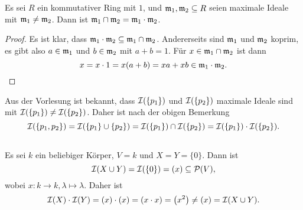 \documentclass[a4paper,10pt]{article}
\begin{document}
\section{}


\subsection{}
\begin{bem}
 Es sei $R$ ein kommutativer Ring mit $1$, und $\mathfrak{m}_1, \mathfrak{m}_2 \subseteq R$ seien maximale Ideale mit $\mathfrak{m}_1 \neq \mathfrak{m}_2$. Dann ist $\mathfrak{m}_1 \cap \mathfrak{m}_2 = \mathfrak{m}_1 \cdot \mathfrak{m}_2$.
\end{bem}
\begin{proof}
 Es ist klar, dass $\mathfrak{m}_1 \cdot \mathfrak{m}_2 \subseteq \mathfrak{m}_1 \cap \mathfrak{m}_2$. Andererseits sind $\mathfrak{m}_1$ und $\mathfrak{m}_2$ koprim, es gibt also $a \in \mathfrak{m}_1$ und $b \in \mathfrak{m}_2$ mit $a+b = 1$. Für $x \in \mathfrak{m}_1 \cap \mathfrak{m}_2$ ist dann
 \[
  x = x \cdot 1 = x (a+b) = xa + xb \in \mathfrak{m}_1 \cdot \mathfrak{m}_2. 
 \]
\end{proof}
Aus der Vorlesung ist bekannt, dass $\mathcal{I}(\{p_1\})$ und $\mathcal{I}(\{p_2\})$ maximale Ideale sind mit $\mathcal{I}(\{p_1\}) \neq \mathcal{I}(\{p_2\})$. Daher ist nach der obigen Bemerkung
\[
 \mathcal{I}(\{p_1, p_2\})
 = \mathcal{I}(\{p_1\} \cup \{p_2\})
 = \mathcal{I}(\{p_1\}) \cap \mathcal{I}(\{p_2\})
 = \mathcal{I}(\{p_1\}) \cdot \mathcal{I}(\{p_2\}).
\]


\subsection{}
Es sei $k$ ein beliebiger Körper, $V = k$ und $X = Y = \{0\}$. Dann ist
\[
 \mathcal{I}(X \cup Y) = \mathcal{I}(\{0\}) = (x) \subseteq \mathcal{P}(V),
\]
wobei $x : k \to k, \lambda \mapsto \lambda$. Daher ist
\[
 \mathcal{I}(X) \cdot \mathcal{I}(Y) = (x) \cdot (x) = (x \cdot x) = \left(x^2\right) \neq (x) = \mathcal{I}(X \cup Y).
\]
\end{document}
